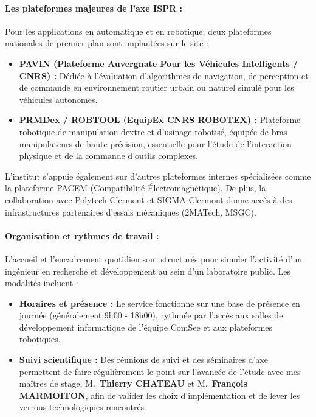 \documentclass[12pt,a4paper,oneside]{report}
\begin{document}
\paragraph{Les plateformes majeures de l'axe ISPR :}
Pour les applications en automatique et en robotique, deux plateformes nationales de premier plan sont implantées sur le site :
\begin{itemize}
    \item \textbf{PAVIN (Plateforme Auvergnate Pour les Véhicules Intelligents / CNRS) :} Dédiée à l'évaluation d'algorithmes de navigation, de perception et de commande en environnement routier urbain ou naturel simulé pour les véhicules autonomes.
    \item \textbf{PRMDex / ROBTOOL (EquipEx CNRS ROBOTEX) :} Plateforme robotique de manipulation dextre et d'usinage robotisé, équipée de bras manipulateurs de haute précision, essentielle pour l'étude de l'interaction physique et de la commande d'outils complexes.
\end{itemize}

L'institut s'appuie également sur d'autres plateformes internes spécialisées comme la plateforme PACEM (Compatibilité Électromagnétique). De plus, la collaboration avec Polytech Clermont et SIGMA Clermont donne accès à des infrastructures partenaires d'essais mécaniques (2MATech, MSGC).

\paragraph{Organisation et rythmes de travail :}
L'accueil et l'encadrement quotidien sont structurés pour simuler l'activité d'un ingénieur en recherche et développement au sein d'un laboratoire public. Les modalités incluent :
\begin{itemize}
    \item \textbf{Horaires et présence :} Le service fonctionne sur une base de présence en journée (généralement 9h00 - 18h00), rythmée par l'accès aux salles de développement informatique de l'équipe ComSee et aux plateformes robotiques.
    \item \textbf{Suivi scientifique :} Des réunions de suivi et des séminaires d'axe permettent de faire régulièrement le point sur l'avancée de l'étude avec mes maîtres de stage, M.~\textbf{Thierry CHATEAU} et M.~\textbf{François MARMOITON}, afin de valider les choix d'implémentation et de lever les verrous technologiques rencontrés.
\end{itemize}
\end{document}
